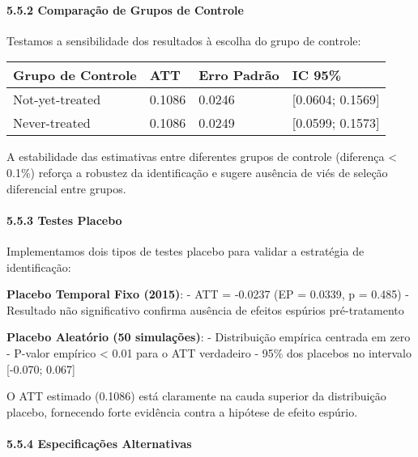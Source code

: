 \documentclass[
  brazilian,
  12pt,
  a4paper,
]{article}
\begin{document}
\paragraph{\texorpdfstring{\textbf{5.5.2 Comparação de Grupos de
Controle}}{5.5.2 Comparação de Grupos de Controle}}\label{comparauxe7uxe3o-de-grupos-de-controle}

Testamos a sensibilidade dos resultados à escolha do grupo de controle:

\begin{longtable}[]{@{}llll@{}}
\toprule\noalign{}
Grupo de Controle & ATT & Erro Padrão & IC 95\% \\
\midrule\noalign{}
\endhead
\bottomrule\noalign{}
\endlastfoot
Not-yet-treated & 0.1086 & 0.0246 & {[}0.0604; 0.1569{]} \\
Never-treated & 0.1086 & 0.0249 & {[}0.0599; 0.1573{]} \\
\end{longtable}

A estabilidade das estimativas entre diferentes grupos de controle
(diferença \textless{} 0.1\%) reforça a robustez da identificação e
sugere ausência de viés de seleção diferencial entre grupos.

\paragraph{\texorpdfstring{\textbf{5.5.3 Testes
Placebo}}{5.5.3 Testes Placebo}}\label{testes-placebo}

Implementamos dois tipos de testes placebo para validar a estratégia de
identificação:

\textbf{Placebo Temporal Fixo (2015)}: - ATT = -0.0237 (EP = 0.0339, p =
0.485) - Resultado não significativo confirma ausência de efeitos
espúrios pré-tratamento

\textbf{Placebo Aleatório (50 simulações)}: - Distribuição empírica
centrada em zero - P-valor empírico \textless{} 0.01 para o ATT
verdadeiro - 95\% dos placebos no intervalo {[}-0.070; 0.067{]}

O ATT estimado (0.1086) está claramente na cauda superior da
distribuição placebo, fornecendo forte evidência contra a hipótese de
efeito espúrio.

\paragraph{\texorpdfstring{\textbf{5.5.4 Especificações
Alternativas}}{5.5.4 Especificações Alternativas}}\label{especificauxe7uxf5es-alternativas}
\end{document}
